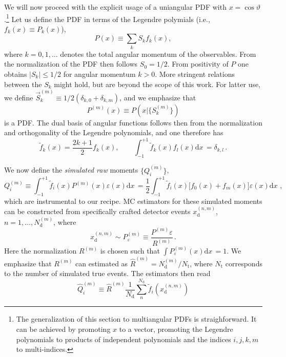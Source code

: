 \documentclass[aps,prd,reprint,nofootinbib,preprintnumbers]{revtex4}
\newcommand{\est}[1]{\widehat{#1}}
\newcommand{\rmdx}[1]{\mbox{d} #1 \,} %
\renewcommand{\theta}{\vartheta}
\let\eps\varepsilon
\begin{document}
We will now proceed with the explicit usage of a uniangular PDF with $x = \cos\theta$.\footnote{%
    The generalization of this section to multiangular PDFs is straighforward. It can be achieved
    by promoting $x$ to a vector, promoting the Legendre polynomials to products of independent polynomials
    and the indices $i,j,k,m$ to multi-indices.
}
Let us define the PDF in terms of the Legendre polymials (i.e., $f_k(x) \equiv P_k(x)$),
\begin{equation}
    P(x) \equiv \sum_k S_k f_k(x),
\end{equation}
where $k = 0, 1, \dots$ denotes the total angular momentum of the observables.
From the normalization of the PDF then follows $S_0 = 1/2$. From positivity of $P$ one
obtains $|S_k| \leq 1/2$ for angular momentum $k > 0$. More stringent relations between the
$S_k$ might hold, but are beyond the scope of this work. For latter use, we define
$\vec{S}^{(m)}_k \equiv 1/2 (\delta_{k,0} + \delta_{k,m})$, and we emphasize that
\begin{equation}
    P^{(m)}(x) \equiv P(x | \lbrace S^{(m)}_k \rbrace)
\end{equation}
is a PDF. The dual basis of angular functions follows then from the normalization
and orthogonality of the Legendre polynomials, and one therefore has
\begin{equation}
    \tilde{f}_k(x) = \frac{2 k + 1}{2} f_k(x),\qquad \int_{-1}^{+1} \tilde{f}_k(x) f_l(x) \rmdx{x} = \delta_{k,l}\,.
\end{equation}


We now define the \emph{simulated raw} moments $\lbrace Q_{i}^{(m)}\rbrace$,
\begin{equation}
    Q_i^{(m)} \equiv \int_{-1}^{+1} \tilde{f}_i(x) P^{(m)}(x) \eps(x) \rmdx{x} = \frac{1}{2} \int_{-1}^{+1} \tilde{f}_i(x) \big[f_0(x) + f_m(x)\big] \eps(x) \rmdx{x}\,,
\end{equation}
which are instrumental to our recipe. MC estimators for these simulated moments can be constructed from specifically crafted detector events $x_\text{d}^{(n,m)}$, $n = 1, \dots, N_\text{d}^{(m)}$, where
\begin{equation}
    x_\text{d}^{(n,m)} \sim P_\eps^{(m)} \equiv \frac{P^{(m)} \eps}{R^{(m)}}\,.
\end{equation}
Here the normalization $R^{(m)}$ is chosen such that $\int P_\eps^{(m)}(x) \rmdx{x} = 1$.
We emphasize that $R^{(m)}$ can estimated as $\est{R}^{(m)} = N_\text{d}^{(m)} / N_\text{t}$, where $N_\text{t}$ corresponds to the number of simulated true events.
The estimators then read
\begin{equation}
    \est{Q}_i^{(m)} \equiv \est{R}^{(m)} \frac{1}{N_\text{d}} \sum_n^{N_\text{d}} \tilde{f}_i(x_\text{d}^{(n,m)})
\end{equation}
\end{document}
